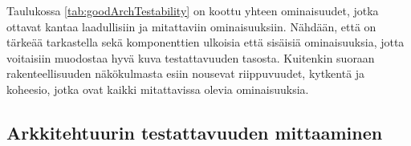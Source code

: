 \documentclass[finnish]{tktltiki2}
\numberwithin{table}{section}
\theoremstyle{definition}
\theoremstyle{remark}
\begin{document}



\begin{table}[H]
	\centering
	\setlength{\extrarowheight}{10pt}%
	\caption{Hyvään testattavuuteen rakenteellisella tasolla vaikuttavat ominaisuudet jaoteltuna kahteen eri luokkaan: laadulliset ja metriset.}
	\label{tab:goodArchTestability}
\end{table}

\noindent
Taulukossa \ref{tab:goodArchTestability} on koottu yhteen ominaisuudet, jotka ottavat kantaa laadullisiin ja mitattaviin ominaisuuksiin. Nähdään, että on tärkeää tarkastella sekä komponenttien ulkoisia että sisäisiä ominaisuuksia, jotta voitaisiin muodostaa hyvä kuva testattavuuden tasosta. Kuitenkin suoraan rakenteellisuuden näkökulmasta esiin nousevat riippuvuudet, kytkentä ja koheesio, jotka ovat kaikki mitattavissa olevia ominaisuuksia. 


\subsection{Arkkitehtuurin testattavuuden mittaaminen} \label{arch_testability_measurement}
\end{document}
